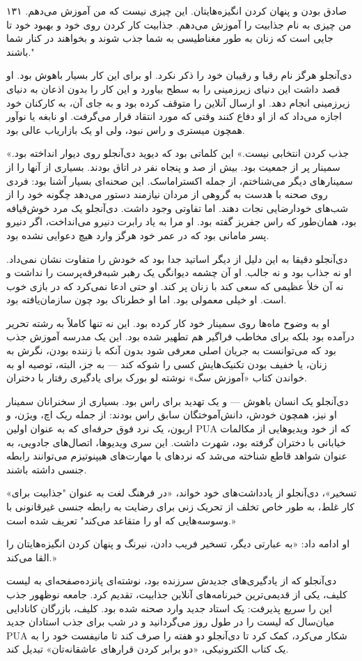 ۱۳۱ صادق بودن و پنهان کردن انگیزه‌هایتان. این چیزی نیست که من آموزش می‌دهم. من چیزی به نام جذابیت را آموزش می‌دهم. جذابیت کار کردن روی خود و بهبود خود تا جایی است که زنان به طور مغناطیسی به شما جذب شوند و بخواهند در کنار شما باشند."

دی‌آنجلو هرگز نام رقبا و رقیبان خود را ذکر نکرد. او برای این کار بسیار باهوش بود. او قصد داشت این دنیای زیرزمینی را به سطح بیاورد و این کار را بدون اذعان به دنیای زیرزمینی انجام دهد. او ارسال آنلاین را متوقف کرده بود و به جای آن، به کارکنان خود اجازه می‌داد که از او دفاع کنند وقتی که مورد انتقاد قرار می‌گرفت. او نابغه یا نوآور همچون میستری و راس نبود، ولی او یک بازاریاب عالی بود.

«جذب کردن انتخابی نیست.» این کلماتی بود که دیوید دی‌آنجلو روی دیوار انداخته بود. سمینار پر از جمعیت بود. بیش از صد و پنجاه نفر در اتاق بودند. بسیاری از آنها را از سمینارهای دیگر می‌شناختم، از جمله اکستراماسک. این صحنه‌ای بسیار آشنا بود: فردی روی صحنه با هدست به گروهی از مردان نیازمند دستور می‌دهد چگونه خود را از شب‌های خودارضایی نجات دهند. اما تفاوتی وجود داشت. دی‌آنجلو یک مرد خوش‌قیافه بود، همان‌طور که راس جفریز گفته بود. او مرا به یاد رابرت دنیرو می‌انداخت، اگر دنیرو پسر مامانی بود که در عمر خود هرگز وارد هیچ دعوایی نشده بود.

دی‌آنجلو دقیقا به این دلیل از دیگر اساتید جدا بود که خودش را متفاوت نشان نمی‌داد. او نه جذاب بود و نه جالب. او آن چشمه دیوانگی یک رهبر شبه‌فرقه‌پرست را نداشت و نه آن خلأ عظیمی که سعی کند با زنان پر کند. او حتی ادعا نمی‌کرد که در بازی خوب است. او خیلی معمولی بود. اما او خطرناک بود چون سازمان‌یافته بود.

او به وضوح ماه‌ها روی سمینار خود کار کرده بود. این نه تنها کاملاً به رشته تحریر درآمده بود بلکه برای مخاطب فراگیر هم تطهیر شده بود. این یک مدرسه آموزش جذب بود که می‌توانست به جریان اصلی معرفی شود بدون آنکه با زننده بودن، نگرش به زنان، یا خفیف بودن تکنیک‌هایش کسی را شوکه کند — به جز، البته، توصیه او به خواندن کتاب «آموزش سگ» نوشته لو بورک برای یادگیری رفتار با دختران.

دی‌آنجلو یک انسان باهوش — و یک تهدید برای راس بود. بسیاری از سخنرانان سمینار او نیز، همچون خودش، دانش‌آموختگان سابق راس بودند: از جمله ریک اچ، ویژن، و اریون، یک نرد فوق حرفه‌ای که به عنوان اولین PUA که از خود ویدیوهایی از مکالمات خیابانی با دختران گرفته بود، شهرت داشت. این سری ویدیوها، اتصال‌های جادویی، به عنوان شواهد قاطع شناخته می‌شد که نردهای با مهارت‌های هیپنوتیزم می‌توانند رابطه جنسی داشته باشند.

«تسخیر»، دی‌آنجلو از یادداشت‌های خود خواند، «در فرهنگ لغت به عنوان "جذابیت برای کار غلط، به طور خاص تخلف از تحریک زنی برای رضایت به رابطه جنسی غیرقانونی با وسوسه‌هایی که او را متقاعد می‌کند" تعریف شده است.»

او ادامه داد: «به عبارتی دیگر، تسخیر فریب دادن، نیرنگ و پنهان کردن انگیزه‌هایتان را القا می‌کند.» 

دی‌آنجلو که از یادگیری‌های جدیدش سرزنده بود، نوشته‌ای پانزده‌صفحه‌ای به لیست کلیف، یکی از قدیمی‌ترین خبرنامه‌های آنلاین جذابیت، تقدیم کرد. جامعه نوظهور جذب این را سریع پذیرفت: یک استاد جدید وارد صحنه شده بود. کلیف، بازرگان کانادایی میان‌سال که لیست را در طول روز می‌گردانید و در شب برای جذب استادان جدید PUA شکار می‌کرد، کمک کرد تا دی‌آنجلو دو هفته را صرف کند تا مانیفست خود را به یک کتاب الکترونیکی، «دو برابر کردن قرارهای عاشقانه‌تان» تبدیل کند.